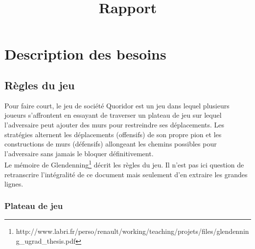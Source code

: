 \documentclass[12pt,a4paper]{article}
\title{Rapport}
\begin{document}
\renewcommand{\contentsname}{Sommaire}





\tableofcontents
\newpage

\section{Description des besoins}

\subsection{Règles du jeu}

Pour faire court, le jeu de société Quoridor est un jeu dans lequel plusieurs joueurs s'affrontent 
en essayant de traverser un plateau de jeu sur lequel l'adversaire peut ajouter 
des murs pour restreindre ses déplacements. Les stratégies alternent les 
déplacements (offensifs) de son propre pion et les constructions de murs 
(défensifs) allongeant les chemins possibles pour l'adversaire sans jamais le 
bloquer définitivement.  \\

Le mémoire de Glendenning\footnote{http://www.labri.fr/perso/renault/working/teaching/projets/files/glendenning\_ugrad\_thesis.pdf}
décrit les règles du jeu. Il n'est pas ici question de retranscrire l'intégralité
de ce document mais seulement d'en extraire les grandes lignes.

\subsubsection{Plateau de jeu}
\end{document}
